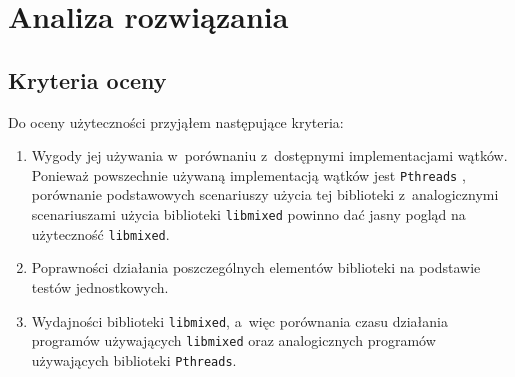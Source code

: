 \documentclass[12pt]{mwart}
\newcommand{\code}{\texttt}
\begin{document}
\section{Analiza rozwiązania}
\label{sec:analysis}
\subsection{Kryteria oceny}
\label{sec:criterions}
\indent
	Do oceny użyteczności przyjąłem następujące kryteria:
	\begin{enumerate}
		\item Wygody jej używania w~porównaniu z~dostępnymi implementacjami wątków. Ponieważ powszechnie używaną implementacją wątków jest \code{Pthreads} \cite{pthread},
      porównanie podstawowych scenariuszy użycia tej biblioteki z~analogicznymi scenariuszami użycia biblioteki \code{libmixed} powinno dać jasny pogląd
      na użyteczność \code{libmixed}.
    \item Poprawności działania poszczególnych elementów biblioteki na podstawie testów jednostkowych.
		\item Wydajności biblioteki \code{libmixed}, a~więc porównania czasu działania programów używających \code{libmixed}
      oraz analogicznych programów używających biblioteki \code{Pthreads}.
	\end{enumerate}
\par
%
\end{document}
